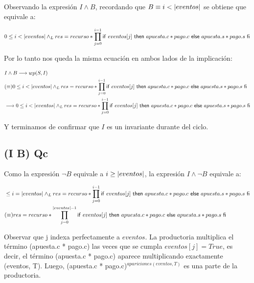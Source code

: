 \documentclass[10pt,a4paper]{article}
\begin{document}
 Observando la expresión $I \land B$, recordando que $B \equiv i < |eventos|$ se obtiene que equivale a:
   
\begin{equation}
	0 \leq i < |eventos| \land _L res = recurso * \prod\limits_{j=0}^{i-1} \mathsf{if}\ eventos[j]\ \mathsf{then}\ apuesta.c * pago.c\ \mathsf{else}\ apuesta.s * pago.s\ \mathsf{fi}
\end{equation}
   
 Por lo tanto nos queda la misma ecuación en ambos lados de la implicación:
   
\begin{equation}
\begin{split}
	& I \land B \longrightarrow wp(S,I)\\
	& (\equiv) 0 \leq i < |eventos| \land _L res = recurso * \prod\limits_{j=0}^{i-1} \mathsf{if}\ eventos[j]\ \mathsf{then}\ apuesta.c * pago.c\ \mathsf{else}\ apuesta.s * pago.s\ \mathsf{fi}\\
	&\longrightarrow 0 \leq i < |eventos| \land _L res = recurso * \prod\limits_{j=0}^{i-1} \mathsf{if}\ eventos[j]\ \mathsf{then}\ apuesta.c * pago.c\ \mathsf{else}\ apuesta.s * pago.s\ \mathsf{fi}
\end{split}
\end{equation}
   
 Y terminamos de confirmar que $I$ es un invariante durante del ciclo.
   
\subsection{(I \land \neg B) \implica Qc}
   
 Como la expresión $\neg B$ equivale a $i \geq |eventos|$, la expresión $I \land \neg B$ equivale a:
	
\begin{equation}
\begin{split}
	& \leq i = \longitud{eventos} \yLuego
 res = recurso * \prod\limits_{j=0}^{i-1} \IfThenElse{eventos[j]}{apuesta.c * pago.c}{apuesta.s * pago.s}\\
   
	& (\equiv) res = recurso * \prod\limits_{j=0}^{\longitud{eventos}-1} \IfThenElse{eventos[j]}{apuesta.c * pago.c}{apuesta.s * pago.s}\\
\end{split}
\end{equation}
   
 Observar que j indexa perfectamente a $eventos$. La productoria multiplica el término (apuesta.c * pago.c) las veces que se cumpla $ eventos[j] = True$,
 es decir, el término (apuesta.c * pago.c) aparece multiplicando exactamente (eventos, T). Luego,
 (apuesta.c * pago.c)$^{apariciones(eventos, T)}$ es una parte de la productoria.
   
\end{document}
